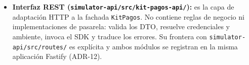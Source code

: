 \begin{itemize}
  \item \textbf{Interfaz REST (\texttt{simulator-api/src/kit-pagos-api/}):} es la capa de adaptación HTTP a la fachada \texttt{KitPagos}. No contiene reglas de negocio ni implementaciones de pasarela: valida los DTO, resuelve credenciales y ambiente, invoca el SDK y traduce los errores. Su frontera con \texttt{simulator-api/src/routes/} es explícita y ambos módulos se registran en la misma aplicación Fastify (ADR-12).
\end{itemize}
